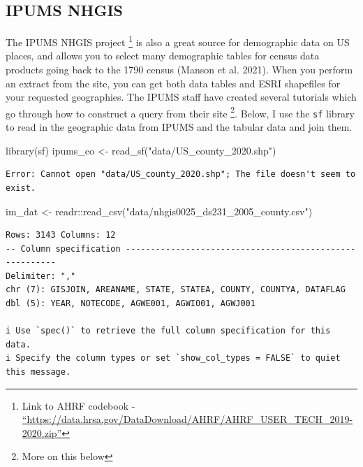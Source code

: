 \documentclass[
  letterpaper,
  DIV=11,
  numbers=noendperiod]{scrreprt}
\newenvironment{Shaded}{\begin{snugshade}}{\end{snugshade}}
\newcommand{\FunctionTok}[1]{\textcolor[rgb]{0.28,0.35,0.67}{#1}}
\newcommand{\NormalTok}[1]{\textcolor[rgb]{0.00,0.23,0.31}{#1}}
\newcommand{\OtherTok}[1]{\textcolor[rgb]{0.00,0.23,0.31}{#1}}
\newcommand{\SpecialCharTok}[1]{\textcolor[rgb]{0.37,0.37,0.37}{#1}}
\newcommand{\StringTok}[1]{\textcolor[rgb]{0.13,0.47,0.30}{#1}}
\begin{document}
\hypertarget{ipums-nhgis}{%
\subsection{IPUMS NHGIS}\label{ipums-nhgis}}

The IPUMS NHGIS project \footnote{Link to AHRF codebook -
  \href{https://data.hrsa.gov/DataDownload/AHRF/AHRF_USER_TECH_2019-2020.zip}{``https://data.hrsa.gov/DataDownload/AHRF/AHRF\_USER\_TECH\_2019-2020.zip''}}
is also a great source for demographic data on US places, and allows you
to select many demographic tables for census data products going back to
the 1790 census (Manson et al. 2021). When you perform an extract from
the site, you can get both data tables and ESRI shapefiles for your
requested geographies. The IPUMS staff have created several tutorials
which go through how to construct a query from their site \footnote{More
  on this below}. Below, I use the \texttt{sf} library to read in the
geographic data from IPUMS and the tabular data and join them.

\begin{Shaded}
\begin{Highlighting}[]
\FunctionTok{library}\NormalTok{(sf)}
\NormalTok{ipums\_co }\OtherTok{\textless{}{-}} \FunctionTok{read\_sf}\NormalTok{(}\StringTok{"data/US\_county\_2020.shp"}\NormalTok{)}
\end{Highlighting}
\end{Shaded}

\begin{verbatim}
Error: Cannot open "data/US_county_2020.shp"; The file doesn't seem to exist.
\end{verbatim}

\begin{Shaded}
\begin{Highlighting}[]
\NormalTok{im\_dat }\OtherTok{\textless{}{-}}\NormalTok{ readr}\SpecialCharTok{::}\FunctionTok{read\_csv}\NormalTok{(}\StringTok{"data/nhgis0025\_ds231\_2005\_county.csv"}\NormalTok{)}
\end{Highlighting}
\end{Shaded}

\begin{verbatim}
Rows: 3143 Columns: 12
-- Column specification --------------------------------------------------------
Delimiter: ","
chr (7): GISJOIN, AREANAME, STATE, STATEA, COUNTY, COUNTYA, DATAFLAG
dbl (5): YEAR, NOTECODE, AGWE001, AGWI001, AGWJ001

i Use `spec()` to retrieve the full column specification for this data.
i Specify the column types or set `show_col_types = FALSE` to quiet this message.
\end{verbatim}
\end{document}
